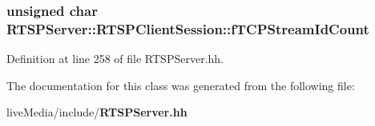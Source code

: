 \subsubsection[{f\+T\+C\+P\+Stream\+Id\+Count}]{\setlength{\rightskip}{0pt plus 5cm}unsigned char R\+T\+S\+P\+Server\+::\+R\+T\+S\+P\+Client\+Session\+::f\+T\+C\+P\+Stream\+Id\+Count\hspace{0.3cm}{\ttfamily [protected]}}\label{classRTSPServer_1_1RTSPClientSession_ae1dfdab3644ea6ed9e9b4ad77a2f5101}


Definition at line 258 of file R\+T\+S\+P\+Server.\+hh.



The documentation for this class was generated from the following file\+:\begin{DoxyCompactItemize}
\item 
live\+Media/include/{\bf R\+T\+S\+P\+Server.\+hh}\end{DoxyCompactItemize}

